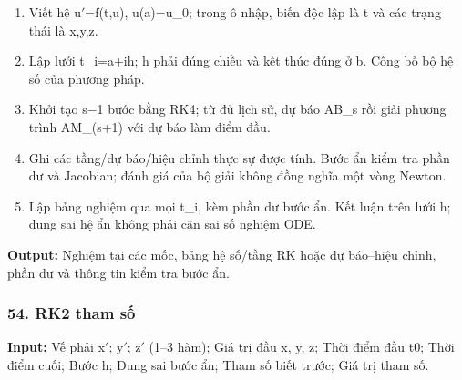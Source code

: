 \begin{enumerate}

\item Viết hệ u\ensuremath{\prime}=\allowbreak{}f(\allowbreak{}t,\allowbreak{}u),\allowbreak{} u(\allowbreak{}a)=\allowbreak{}u\_0;\allowbreak{} trong ô nhập,\allowbreak{} biến độc lập là t và các trạng thái là x,\allowbreak{}y,\allowbreak{}z.

\item Lập lưới t\_i=\allowbreak{}a+\allowbreak{}ih;\allowbreak{} h phải đúng chiều và kết thúc đúng ở b. Công bố bộ hệ số của phương pháp.

\item Khởi tạo s\ensuremath{-}1 bước bằng RK4;\allowbreak{} từ đủ lịch sử,\allowbreak{} dự báo AB\_s rồi giải phương trình AM\_(\allowbreak{}s+\allowbreak{}1) với dự báo làm điểm đầu.

\item Ghi các tầng/\allowbreak{}dự báo/\allowbreak{}hiệu chỉnh thực sự được tính. Bước ẩn kiểm tra phần dư và Jacobian;\allowbreak{} đánh giá của bộ giải không đồng nghĩa một vòng Newton.

\item Lập bảng nghiệm qua mọi t\_i,\allowbreak{} kèm phần dư bước ẩn. Kết luận trên lưới h;\allowbreak{} dung sai hệ ẩn không phải cận sai số nghiệm ODE.

\end{enumerate}

\textbf{Output:} Nghiệm tại các mốc,\allowbreak{} bảng hệ số/\allowbreak{}tầng RK hoặc dự báo–hiệu chỉnh,\allowbreak{} phần dư và thông tin kiểm tra bước ẩn.

\examplebreak\subsubsection*{54. RK2 tham số}

\textbf{Input:} Vế phải x\ensuremath{\prime};\allowbreak{} y\ensuremath{\prime};\allowbreak{} z\ensuremath{\prime} (\allowbreak{}1–3 hàm);\allowbreak{} Giá trị đầu x,\allowbreak{} y,\allowbreak{} z;\allowbreak{} Thời điểm đầu t0;\allowbreak{} Thời điểm cuối;\allowbreak{} Bước h;\allowbreak{} Dung sai bước ẩn;\allowbreak{} Tham số biết trước;\allowbreak{} Giá trị tham số.

